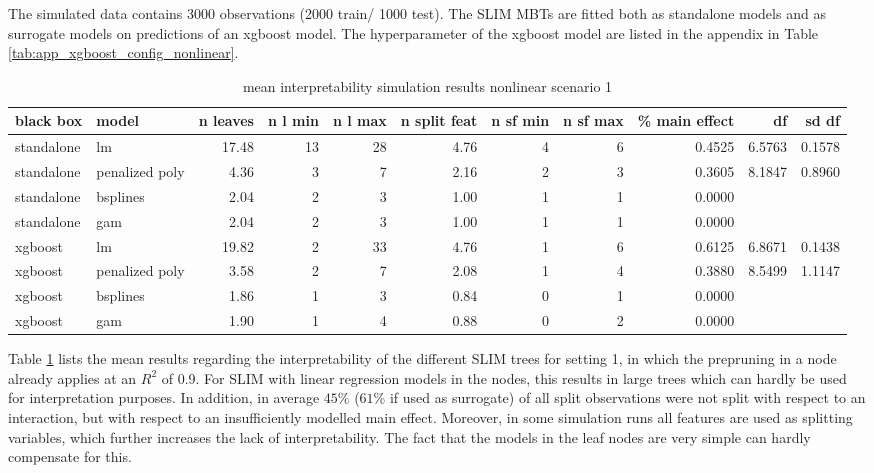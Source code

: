 The simulated data contains 3000 observations (2000 train/ 1000 test). The SLIM MBTs are fitted both as standalone models and as surrogate models on predictions of an xgboost model. The hyperparameter of the xgboost model are listed in the appendix in Table \ref{tab:app_xgboost_config_nonlinear}.


\begin{table}[!htb]
\centering \tiny
\begin{tabular}[t]{l|l|r|r|r|r|r|r|r|r|r}
\hline
black box & model & n leaves & n l min & n l max & n split feat & n sf min & n sf max & \% main effect & df & sd df\\
\hline
standalone & lm & 17.48 & 13 & 28 & 4.76 & 4 & 6 & 0.4525 & 6.5763 & 0.1578\\
standalone & penalized poly & 4.36 & 3 & 7 & 2.16 & 2 & 3 & 0.3605 & 8.1847 & 0.8960\\
standalone & bsplines & 2.04 & 2 & 3 & 1.00 & 1 & 1 & 0.0000 &  & \\
standalone & gam & 2.04 & 2 & 3 & 1.00 & 1 & 1 & 0.0000 &  & \\
\hline
xgboost & lm & 19.82 & 2 & 33 & 4.76 & 1 & 6 & 0.6125 & 6.8671 & 0.1438\\
xgboost & penalized poly & 3.58 & 2 & 7 & 2.08 & 1 & 4 & 0.3880 & 8.5499 & 1.1147\\
xgboost & bsplines & 1.86 & 1 & 3 & 0.84 & 0 & 1 & 0.0000 &  & \\
xgboost & gam & 1.90 & 1 & 4 & 0.88 & 0 & 2 & 0.0000 &  & \\

\hline
\end{tabular}
\caption{mean interpretability simulation results nonlinear scenario 1}
\label{tab:linear_mixed_1_interpretability}

\end{table}

Table \ref{tab:linear_mixed_1_interpretability} lists the mean results regarding the interpretability of the different SLIM trees for setting 1, in which the prepruning in a node already applies at an $R^2$ of 0.9. For SLIM with linear regression models in the nodes, this results in large trees which can hardly be used for interpretation purposes.
In addition, in average $45\%$ ($61\%$ if used as surrogate) of all split observations were not split with respect to an interaction, but with respect to an insufficiently modelled main effect. Moreover, in some simulation runs all features are used as splitting variables, which further increases the lack of interpretability.
The fact that the models in the leaf nodes are very simple can hardly compensate for this. 

